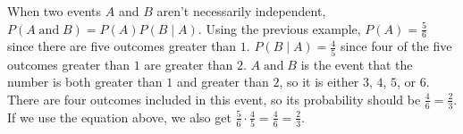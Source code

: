 \documentclass[twocolumn]{article}
\newcommand{\pand}{\mathop\text{and}}
\begin{document}
When two events $A$ and $B$ aren't necessarily independent, $P(A \pand B) = P(A)P(B \mid A)$.
Using the previous example, $P(A) = \frac{5}{6}$ since there are five outcomes greater than $1$.
$P(B \mid A) = \frac{4}{5}$ since four of the five outcomes greater than $1$ are greater than $2$.
$A \pand B$ is the event that the number is both greater than $1$ and greater than $2$, so it is either $3$, $4$, $5$, or $6$.
There are four outcomes included in this event, so its probability should be $\frac{4}{6} = \frac{2}{3}$.
If we use the equation above, we also get $\frac{5}{6} \cdot \frac{4}{5} = \frac{4}{6} = \frac{2}{3}$.
\end{document}
